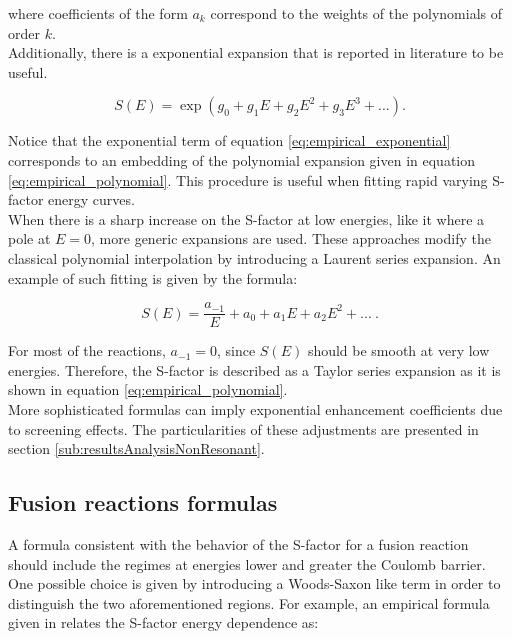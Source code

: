 \documentclass[openany]{book}
\begin{document}
where coefficients of the form $a_k$ correspond to the weights of the polynomials of order $k$. \\

Additionally,  there is a exponential expansion that is reported in literature to be useful. 

\begin{equation} \label{eq:empirical_exponential}
	S(E) = \exp{(g_0 + g_1E + g_2E^2 + g_3E^3 + ...)}.
\end{equation}

Notice that the exponential term of equation \ref{eq:empirical_exponential} corresponds to an embedding of the polynomial expansion given in equation \ref{eq:empirical_polynomial}. This procedure is useful when fitting rapid varying S-factor energy curves. \\

When there is a sharp increase on the S-factor at low energies, like it where a pole at $E = 0$,  more generic expansions are used. These approaches modify the classical polynomial interpolation by introducing a Laurent series expansion. An example of such fitting is given by the formula: 

\begin{equation}  \label{eq:empirical_laurent}
	S(E) =\frac{ a_{-1}}{E} + a_0 + a_1 E + a_2 E^2 + ... \ .
\end{equation}

For most of the reactions, $a_{-1} = 0$, since $S(E)$ should be smooth at very low energies. Therefore, the S-factor is  described as a Taylor series expansion as it is shown in equation \ref{eq:empirical_polynomial}. \\

More sophisticated formulas can imply exponential enhancement coefficients due to screening effects. The particularities of these adjustments are presented in section \ref{sub:resultsAnalysisNonResonant}. 

\subsection{Fusion reactions formulas} \label{sub:empirical_fusion}

A formula consistent with the behavior of the S-factor for a  fusion reaction should include the regimes at energies lower and greater the Coulomb barrier. One possible choice is given by introducing a Woods-Saxon like term in order to distinguish the two aforementioned regions. For example, an empirical formula given in  \cite{beard_afanasjev_chamon_gasques_wiescher_yakovlev_2010} relates the S-factor energy dependence as:
\end{document}
